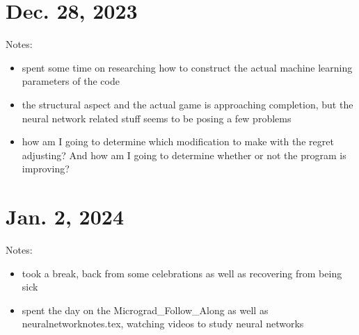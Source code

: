 \documentclass{article}
\begin{document}
\section{Dec. 28, 2023}
Notes:
\begin{itemize}
    \item spent some time on researching how
to construct the actual machine learning parameters
of the code
    \item the structural aspect and the actual game
is approaching completion, but the neural network
related stuff seems to be posing a few problems
    \item how am I going to determine which 
modification to make with the regret adjusting? And 
how am I going to determine whether or not the 
program is improving?
\end{itemize}

\section{Jan. 2, 2024}
Notes:
\begin{itemize}
    \item took a break, back from some celebrations
as well as recovering from being sick
    \item spent the day on the Micrograd_Follow_Along
as well as neuralnetworknotes.tex, watching videos to 
study neural networks
\end{itemize}
\end{document}

